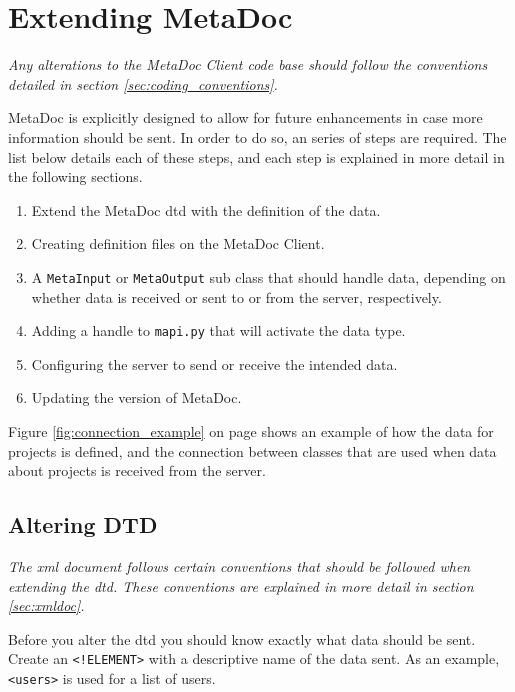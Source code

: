 \newpage
\section{Extending MetaDoc}
\label{sec:extending}
\textit{Any alterations to the MetaDoc Client code base should follow the
conventions detailed in section \ref{sec:coding_conventions}.}

MetaDoc is explicitly designed to allow for future enhancements in case more
information should be sent. In order to do so, an series of steps are required.
The list below details each of these steps, and each step is explained in more
detail in the following sections.

\begin{enumerate}
    \item
        Extend the MetaDoc \gls{dtd} with the definition of the data.
    \item
        Creating definition files on the MetaDoc Client.
    \item
        A \texttt{MetaInput} or \texttt{MetaOutput} sub class that should
        handle data, depending on whether data is received or sent to or from
        the server, respectively.
    \item
        Adding a handle to \texttt{mapi.py} that will activate the data type.
    \item
        Configuring the server to send or receive the intended data.
    \item
        Updating the version of MetaDoc.
\end{enumerate}

Figure \ref{fig:connection_example} on page \pageref{fig:connection_example}
shows an example of how the data for projects is defined, and the connection
between classes that are used when data about projects is received from the
server.


\subsection{Altering DTD}
\textit{The \gls{xml} document follows certain conventions that should be
followed when extending the \gls{dtd}. These conventions are explained in more
detail in section \ref{sec:xmldoc}.}

Before you alter the \gls{dtd} you should know exactly what data should be
sent.  Create an \texttt{<!ELEMENT>} with a descriptive name of the data sent.
As an example, \texttt{<users>} is used for a list of users. 

